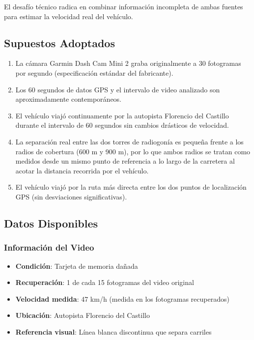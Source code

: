 \documentclass[12pt]{article}
\begin{document}
El desafío técnico radica en combinar información incompleta de ambas fuentes para estimar la velocidad real del vehículo.

\subsection*{Supuestos Adoptados}

\begin{enumerate}
    \item La cámara Garmin Dash Cam Mini 2 graba originalmente a 30 fotogramas por segundo (especificación estándar del fabricante).

    \item Los 60 segundos de datos GPS y el intervalo de video analizado son aproximadamente contemporáneos.

    \item El vehículo viajó continuamente por la autopista Florencio del Castillo durante el intervalo de 60 segundos sin cambios drásticos de velocidad.

    \item La separación real entre las dos torres de radiogonía es pequeña frente a los radios de cobertura (600 m y 900 m), por lo que ambos radios se tratan como medidos desde un mismo punto de referencia a lo largo de la carretera al acotar la distancia recorrida por el vehículo.

    \item El vehículo viajó por la ruta más directa entre los dos puntos de localización GPS (sin desviaciones significativas).
\end{enumerate}

\subsection*{Datos Disponibles}

\subsubsection*{Información del Video}

\begin{itemize}
    \item \textbf{Condición}: Tarjeta de memoria dañada
    \item \textbf{Recuperación}: 1 de cada 15 fotogramas del video original
    \item \textbf{Velocidad medida}: 47 km/h (medida en los fotogramas recuperados)
    \item \textbf{Ubicación}: Autopista Florencio del Castillo
    \item \textbf{Referencia visual}: Línea blanca discontinua que separa carriles
\end{itemize}
\end{document}
